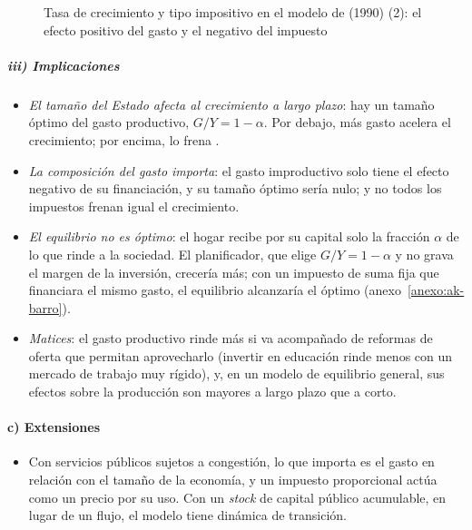 \documentclass[11pt]{article}
\begin{document}
\begin{figure}[H]
\centering
\caption{Tasa de crecimiento y tipo impositivo en el modelo de  (1990) (2): el efecto positivo del gasto y el negativo del impuesto}\label{fig:barro}
\end{figure}

\subparagraph{iii) Implicaciones}

\begin{itemize}
\item \emph{El tamaño del Estado afecta al crecimiento a largo plazo}: hay un tamaño óptimo del gasto productivo, $G/Y=1-\alpha$. Por debajo, más gasto acelera el crecimiento; por encima, lo frena .
\item \emph{La composición del gasto importa}: el gasto improductivo solo tiene el efecto negativo de su financiación, y su tamaño óptimo sería nulo; y no todos los impuestos frenan igual el crecimiento.
\item \emph{El equilibrio no es óptimo}: el hogar recibe por su capital solo la fracción $\alpha$ de lo que rinde a la sociedad. El planificador, que elige $G/Y=1-\alpha$ y no grava el margen de la inversión, crecería más; con un impuesto de suma fija que financiara el mismo gasto, el equilibrio alcanzaría el óptimo\nocite{BarroSalaiMartin2004} (anexo~\ref{anexo:ak-barro}).
\item \emph{Matices}: el gasto productivo rinde más si va acompañado de reformas de oferta que permitan aprovecharlo (invertir en educación rinde menos con un mercado de trabajo muy rígido), y, en un modelo de equilibrio general, sus efectos sobre la producción son mayores a largo plazo que a corto\nocite{BaxterKing1993}.
\end{itemize}

\paragraph{c) Extensiones}

\begin{itemize}
\item Con servicios públicos sujetos a congestión, lo que importa es el gasto en relación con el tamaño de la economía, y un impuesto proporcional actúa como un precio por su uso\nocite{BarroSalaiMartin1992Public}. Con un \emph{stock} de capital público acumulable, en lugar de un flujo, el modelo tiene dinámica de transición.
\end{itemize}
\end{document}
